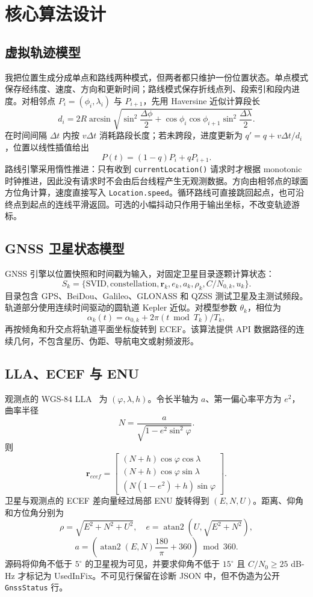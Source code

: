 \section{核心算法设计}
\subsection{虚拟轨迹模型}
我把位置生成分成单点和路线两种模式，但两者都只维护一份位置状态。单点模式保存经纬度、速度、方向和更新时间；路线模式保存折线点列、段索引和段内进度。对相邻点 $P_i=(\phi_i,\lambda_i)$ 与 $P_{i+1}$，先用 Haversine 近似计算段长
\[
 d_i=2R\arcsin\sqrt{\sin^2\frac{\Delta\phi}{2}+\cos\phi_i\cos\phi_{i+1}\sin^2\frac{\Delta\lambda}{2}}.
\]
在时间间隔 $\Delta t$ 内按 $v\Delta t$ 消耗路段长度；若未跨段，进度更新为 $q'=q+v\Delta t/d_i$，位置以线性插值给出
\[
 P(t)=(1-q)P_i+qP_{i+1}.
\]
路线引擎采用惰性推进：只有收到 \texttt{currentLocation()} 请求时才根据 monotonic 时钟推进，因此没有请求时不会由后台线程产生无观测数据。方向由相邻点的球面方位角计算，速度直接写入 \texttt{Location.speed}。循环路线可直接跳回起点，也可沿终点到起点的连线平滑返回。可选的小幅抖动只作用于输出坐标，不改变轨迹游标。

\subsection{GNSS 卫星状态模型}
GNSS 引擎以位置快照和时间戳为输入，对固定卫星目录逐颗计算状态：
\[
 S_k=\{\mathrm{SVID},\mathrm{constellation},\mathbf{r}_k, e_k, a_k, \rho_k, C/N_{0,k}, u_k\}.
\]
目录包含 GPS、BeiDou、Galileo、GLONASS 和 QZSS 测试卫星及主测试频段。轨道部分使用连续时间驱动的圆轨道 Kepler 近似。对模型参数 $\theta_k$，相位为
\[
 \alpha_k(t)=\alpha_{0,k}+2\pi (t\bmod T_k)/T_k,
\]
再按倾角和升交点将轨道平面坐标旋转到 ECEF。该算法提供 API 数据路径的连续几何，不包含星历、伪距、导航电文或射频波形。

\subsection{LLA、ECEF 与 ENU}
观测点的 WGS-84 LLA~\citep{wgs84} 为 $(\varphi,\lambda,h)$。令长半轴为 $a$、第一偏心率平方为 $e^2$，曲率半径
\[
 N=\frac{a}{\sqrt{1-e^2\sin^2\varphi}}.
\]
则
\[
 \mathbf{r}_{ecef}=\begin{bmatrix}(N+h)\cos\varphi\cos\lambda\\(N+h)\cos\varphi\sin\lambda\\(N(1-e^2)+h)\sin\varphi\end{bmatrix}.
\]
卫星与观测点的 ECEF 差向量经过局部 ENU 旋转得到 $(E,N,U)$。距离、仰角和方位角分别为
\[
 \rho=\sqrt{E^2+N^2+U^2},\quad e=\operatorname{atan2}(U,\sqrt{E^2+N^2}),
\]
\[
 a=\left(\operatorname{atan2}(E,N)\frac{180}{\pi}+360\right)\bmod 360.
\]
源码将仰角不低于 $5^\circ$ 的卫星视为可见，并要求仰角不低于 $15^\circ$ 且 $C/N_0\geq25$ dB-Hz 才标记为 UsedInFix。不可见行保留在诊断 JSON 中，但不伪造为公开 \texttt{GnssStatus} 行。

